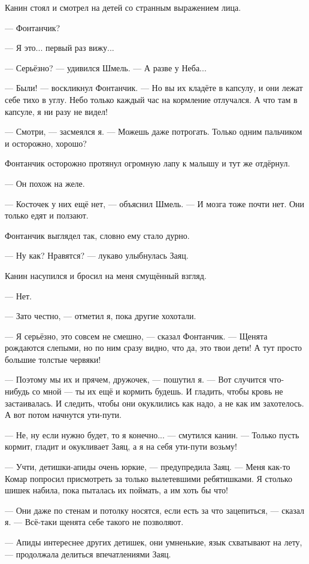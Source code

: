 Канин стоял и смотрел на детей со странным выражением лица.

--- Фонтанчик?

--- Я это... первый раз вижу...

--- Серьёзно? --- удивился Шмель.
--- А разве у Неба...

--- Были! --- воскликнул Фонтанчик.
--- Но вы их кладёте в капсулу, и они лежат себе тихо в углу.
Небо только каждый час на кормление отлучался.
А что там в капсуле, я ни разу не видел!

--- Смотри, --- засмеялся я.
--- Можешь даже потрогать.
Только одним пальчиком и осторожно, хорошо?

Фонтанчик осторожно протянул огромную лапу к малышу и тут же отдёрнул.

--- Он похож на желе.

--- Косточек у них ещё нет, --- объяснил Шмель.
--- И мозга тоже почти нет.
Они только едят и ползают.

Фонтанчик выглядел так, словно ему стало дурно.

--- Ну как?
Нравятся? --- лукаво улыбнулась Заяц.

Канин насупился и бросил на меня смущённый взгляд.

--- Нет.

--- Зато честно, --- отметил я, пока другие хохотали.

--- Я серьёзно, это совсем не смешно, --- сказал Фонтанчик.
--- Щенята рождаются слепыми, но по ним сразу видно, что да, это твои дети!
А тут просто большие толстые червяки!

--- Поэтому мы их и прячем, дружочек, --- пошутил я.
--- Вот случится что-нибудь со мной --- ты их ещё и кормить будешь.
И гладить, чтобы кровь не застаивалась.
И следить, чтобы они окуклились как надо, а не как им захотелось.
А вот потом начнутся ути-пути.

--- Не, ну если нужно будет, то я конечно... --- смутился канин.
--- Только пусть кормит, гладит и окукливает Заяц, а я на себя ути-пути возьму!

--- Учти, детишки-апиды очень юркие, --- предупредила Заяц.
--- Меня как-то Комар попросил присмотреть за только вылетевшими ребятишками.
Я столько шишек набила, пока пыталась их поймать, а им хоть бы что!

--- Они даже по стенам и потолку носятся, если есть за что зацепиться, --- сказал я.
--- Всё-таки щенята себе такого не позволяют.

--- Апиды интереснее других детишек, они умненькие, язык схватывают на лету, --- продолжала делиться впечатлениями Заяц.

